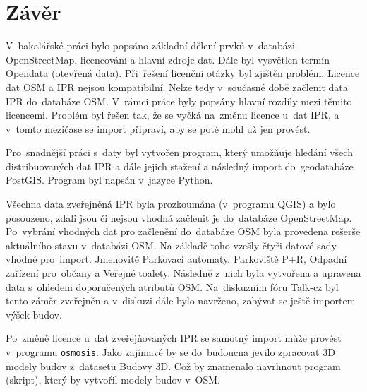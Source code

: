 \chapter{Závěr}
\label{5-zaver}

V~bakalářské práci bylo popsáno základní dělení prvků v~databázi
OpenStreetMap, licencování a hlavní zdroje dat. Dále byl vysvětlen termín
Opendata (otevřená data).
Při~řešení licenční otázky byl zjištěn problém. Licence dat
OSM a IPR nejsou kompatibilní. Nelze tedy v~současné době začlenit
data IPR do~databáze OSM. V~rámci práce byly popsány hlavní rozdíly mezi těmito licencemi.
Problém byl řešen tak, že se vyčká na~změnu licence u~dat IPR, a
v~tomto mezičase se import připraví, aby se poté mohl už jen provést.


Pro~snadnější práci s~daty byl vytvořen program, který umožňuje hledání
všech distribuovaných dat IPR a dále jejich stažení a
následný import do~geodatabáze PostGIS. Program byl napsán v~jazyce
Python.


Všechna data zveřejněná IPR byla prozkoumána (v~programu QGIS)
a bylo posouzeno, zdali jsou či nejsou vhodná začlenit je do~databáze
OpenStreetMap. Po~vybrání vhodných dat pro začlenění do~databáze OSM byla
provedena rešerše aktuálního stavu v~databázi OSM.
Na základě toho vzešly čtyři datové sady vhodné pro~import.
Jmenovitě Parkovací automaty, Parkoviště P+R, Odpadní zařízení
pro~občany a Veřejné toalety. Následně z~nich byla vytvořena a upravena
data s~ohledem doporučených atributů OSM.
Na~diskuzním fóru Talk-cz byl tento záměr zveřejněn a v~diskuzi dále bylo
navrženo, zabývat se ještě importem výšek budov.


Po~změně licence u~dat zveřejňovaných IPR se samotný import může provést
v~programu {\tt osmosis}.
Jako zajímavé by se do~budoucna jevilo zpracovat 3D modely budov
z~datasetu Budovy 3D. Což by znamenalo navrhnout program (skript), který by vytvořil
modely budov v~OSM.

